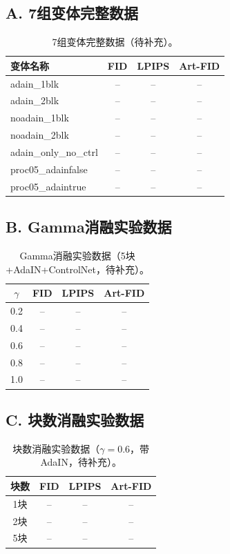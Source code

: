 \documentclass[twocolumn,a4paper,11pt]{ctexart}
\begin{document}
\subsection*{A. 7组变体完整数据}

\begin{table}[ht]
  \centering
  \small
  \caption{7组变体完整数据（待补充）。}
  \label{tab:appendix_a}
  \begin{tabular}{lccc}
    \toprule
    变体名称 & FID & LPIPS & Art-FID \\
    \midrule
    adain\_1blk & -- & -- & -- \\
    adain\_2blk & -- & -- & -- \\
    noadain\_1blk & -- & -- & -- \\
    noadain\_2blk & -- & -- & -- \\
    adain\_only\_no\_ctrl & -- & -- & -- \\
    proc05\_adainfalse & -- & -- & -- \\
    proc05\_adaintrue & -- & -- & -- \\
    \bottomrule
  \end{tabular}
\end{table}

\subsection*{B. Gamma消融实验数据}

\begin{table}[ht]
  \centering
  \small
  \caption{Gamma消融实验数据（5块+AdaIN+ControlNet，待补充）。}
  \label{tab:appendix_b}
  \begin{tabular}{cccc}
    \toprule
    $\gamma$ & FID & LPIPS & Art-FID \\
    \midrule
    0.2 & -- & -- & -- \\
    0.4 & -- & -- & -- \\
    0.6 & -- & -- & -- \\
    0.8 & -- & -- & -- \\
    1.0 & -- & -- & -- \\
    \bottomrule
  \end{tabular}
\end{table}

\subsection*{C. 块数消融实验数据}

\begin{table}[ht]
  \centering
  \small
  \caption{块数消融实验数据（$\gamma = 0.6$，带AdaIN，待补充）。}
  \label{tab:appendix_c}
  \begin{tabular}{cccc}
    \toprule
    块数 & FID & LPIPS & Art-FID \\
    \midrule
    1块 & -- & -- & -- \\
    2块 & -- & -- & -- \\
    5块 & -- & -- & -- \\
    \bottomrule
  \end{tabular}
\end{table}
\end{document}
